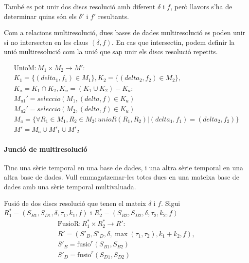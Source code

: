 També es pot unir dos discs resolució amb diferent $\delta$ i $f$,
però llavors s'ha de determinar quins són els $\delta'$ i $f'$
resultants.


Com a relacions multiresolució, dues bases de dades multiresolució es
poden unir si no intersecten en les claus $(\delta,f)$.  En cas que
intersectin, podem definir la unió multiresolució com la unió que sap unir els discs resolució repetits.

\begin{gather*}
    \text{UnioM}: M_1 \times M_2 \longrightarrow M': \\
    K_1 = \{(delta_1,f_1) \in M_1\},K_2 = \{(delta_2,f_2) \in M_2\}, \\
    K_a = K_1 \cap K_2, K_u =  (K_1 \cup K_2) - K_a : \\
    M_{u1}'= seleccio(M_1, (delta,f) \in K_u)\\
    M_{u2}'= seleccio(M_2, (delta,f) \in K_u)\\
    M_a = \{\forall R_1\in M_1,R_2\in M_2: unioR(R_1,R_2) |
       (delta_1,f_1) = (delta_2,f_2) \} \\
    M' =  M_{a} \cup  M'_{1}  \cup  M'_{2}     
\end{gather*}






\paragraph{Junció de multiresolució}


Tinc una sèrie temporal en una base de dades, i una altra sèrie temporal en una altra base de dades. Vull emmagatzemar-les totes dues en una mateixa base de dades amb una sèrie temporal multivaluada.


Fusió de dos discs resolució que tenen el mateix $\delta$ i $f$.
Sigui $R_1^*=(S_{B1},S_{D1},\delta,\tau_1,k_1,f)$ i
$R_2^*=(S_{B2},S_{D2},\delta,\tau_2,k_2,f)$
  \begin{gather*}
    \text{FusioR}: R_1^* \times R_2^* \longrightarrow R': \\
    R' = (S'_B,S'_D,\delta,\max(\tau_1,\tau_2),k_1+k_2,f), \\
    S'_B = \text{fusio}^r(S_{B1},S_{B2})\\
    S'_D = \text{fusio}^r(S_{D1},S_{D2})
\end{gather*}


